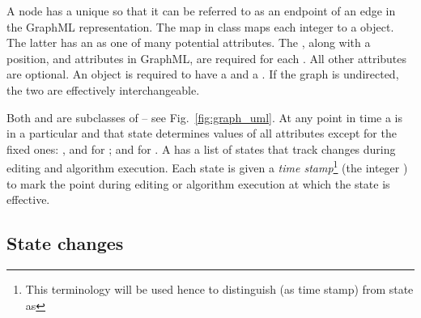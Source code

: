 A node has a unique  so that it can be referred to as an endpoint of
an edge in the GraphML representation. The map  in class
 maps each integer  to a  object.
The latter has an  as one of many potential attributes.
The , along with a position,  and  attributes in
GraphML, are required for each . All other attributes are
optional.
An  object is required to have a  and a
. If the graph is undirected, the two are effectively interchangeable.

Both  and  are subclasses of  -- see
Fig.~\ref{fig:graph_uml}.
At any point in time a  is in a particular
 and that state determines values of all attributes
except for the fixed ones: ,  and  for ;
 and  for .
A  has a list of states that track changes during
editing and algorithm execution.
Each state is given a \emph{time stamp}\footnote{This terminology will be
  used hence to distinguish  (as time stamp) from state as
  } (the integer ) to mark the point
during editing or algorithm execution at which the state is effective.

\subsection{State changes}

